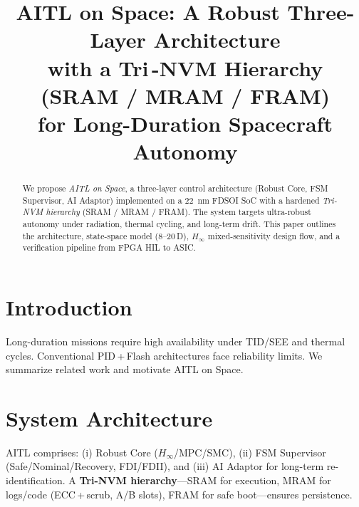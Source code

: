 \documentclass[conference]{IEEEtran}
\title{AITL on Space: A Robust Three-Layer Architecture\\
with a Tri\,-NVM Hierarchy (SRAM / MRAM / FRAM)\\
for Long-Duration Spacecraft Autonomy}
\author{%
  \IEEEauthorblockN{Shinichi Samizo}
  \IEEEauthorblockA{Independent Semiconductor Researcher\\
  Former Engineer at Seiko Epson Corporation\\
  Email: \href{mailto:shin3t72@gmail.com}{shin3t72@gmail.com}\quad
  GitHub: \url{https://github.com/Samizo-AITL}}%
}
\begin{document}
\maketitle

\begin{abstract}
We propose \emph{AITL on Space}, a three-layer control architecture (Robust Core, FSM Supervisor, AI Adaptor) implemented on a \SI{22}{nm} FDSOI SoC with a hardened \emph{Tri-NVM hierarchy} (SRAM / MRAM / FRAM). The system targets ultra-robust autonomy under radiation, thermal cycling, and long-term drift. This paper outlines the architecture, state-space model (8--20\,D), $H_\infty$ mixed-sensitivity design flow, and a verification pipeline from FPGA HIL to ASIC.
\end{abstract}
\FloatBarrier %

\section{Introduction}
Long-duration missions require high availability under TID/SEE and thermal cycles. Conventional PID\,+\,Flash architectures face reliability limits. We summarize related work and motivate AITL on Space.

\section{System Architecture}
AITL comprises: (i) Robust Core ($H_\infty$/MPC/SMC), (ii) FSM Supervisor (Safe/Nominal/Recovery, FDI/FDII), and (iii) AI Adaptor for long-term re-identification. A \textbf{Tri-NVM hierarchy}---SRAM for execution, MRAM for logs/code (ECC\,+\,scrub, A/B slots), FRAM for safe boot---ensures persistence.
\end{document}
